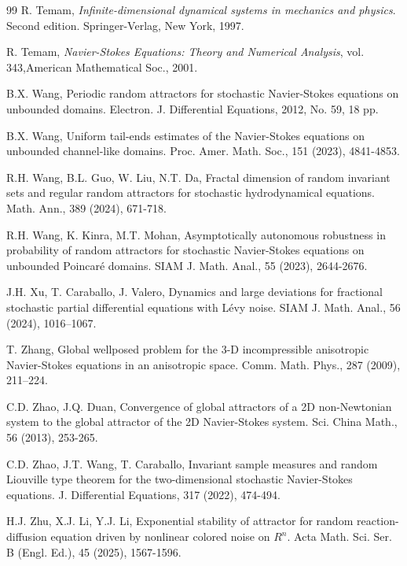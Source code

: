 \documentclass{elsarticle}
\theoremstyle{definition}
\numberwithin{equation}{section}
\begin{document}
\begin{thebibliography}{99}
  R. Temam,  {\em Infinite-dimensional dynamical systems in mechanics and physics}. Second edition. Springer-Verlag, New York, 1997.

  R. Temam,  {\em Navier-Stokes Equations: Theory and Numerical Analysis}, vol. 343,American Mathematical Soc., 2001.


  B.X.  Wang,    Periodic random attractors for stochastic Navier-Stokes equations on unbounded domains. Electron. J. Differential Equations, 2012, No. 59, 18 pp.

 B.X.  Wang,    Uniform tail-ends estimates of the Navier-Stokes equations on unbounded channel-like domains. Proc. Amer. Math. Soc., 151 (2023), 4841-4853.

 R.H.  Wang, B.L. Guo, W. Liu, N.T. Da,    Fractal dimension of random invariant sets and regular random attractors for stochastic hydrodynamical equations.  Math. Ann.,  389 (2024), 671-718.


 R.H.  Wang, K. Kinra, M.T. Mohan,    Asymptotically autonomous robustness in probability of random attractors for stochastic Navier-Stokes equations on unbounded Poincar\'{e} domains. SIAM J. Math. Anal., 55 (2023), 2644-2676.



J.H. Xu, T. Caraballo, J. Valero, Dynamics and large deviations for fractional stochastic partial differential equations with L\'{e}vy noise. SIAM J. Math. Anal., 56 (2024),  1016–1067.






T. Zhang,  Global wellposed problem for the 3-D incompressible anisotropic Navier-Stokes equations in an anisotropic space. Comm. Math. Phys., 287 (2009), 211–224.

   C.D.  Zhao,  J.Q. Duan,   Convergence of global attractors of a 2D non-Newtonian system to the global attractor of the 2D Navier-Stokes system. Sci. China Math., 56 (2013), 253-265.

C.D.  Zhao,  J.T. Wang, T. Caraballo, Invariant sample measures and random Liouville type theorem for the two-dimensional stochastic Navier-Stokes equations. J. Differential Equations, 317 (2022), 474-494.

H.J. Zhu, X.J. Li, Y.J.  Li,
Exponential stability of attractor for random reaction-diffusion equation driven by nonlinear colored noise on $R^n$.
Acta Math. Sci. Ser. B (Engl. Ed.),  45 (2025), 1567-1596.





\end{thebibliography}
\end{document}

